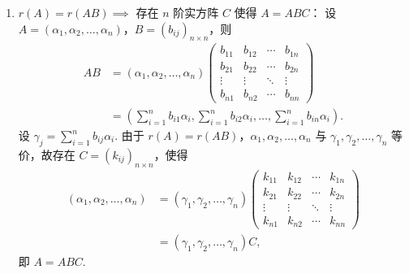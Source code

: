 \begin{exercise}
\begin{exgroup}
\begin{answer}
\begin{enumerate}
                \item $r(A) = r(AB) \implies$ 存在 $n$ 阶实方阵 $C$ 使得 $A = ABC$：
                    设 $A = (\alpha_1, \alpha_2, \ldots, \alpha_n)$，$B = (b_{ij})_{n \times n}$，则
                    \begin{align*}
                        AB &= (\alpha_1, \alpha_2, \ldots, \alpha_n) \begin{pmatrix}
                                  b_{11} & b_{12} & \cdots & b_{1n} \\
                                  b_{21} & b_{22} & \cdots & b_{2n} \\
                                  \vdots & \vdots & \ddots & \vdots \\
                                  b_{n1} & b_{n2} & \cdots & b_{nn}
                              \end{pmatrix} \\
                           &= \left( \sum\limits_{i=1}^n b_{i1} \alpha_i, \sum\limits_{i=1}^n b_{i2} \alpha_i, \ldots, \sum\limits_{i=1}^n b_{in} \alpha_i \right).
                    \end{align*}
                    设 $\gamma_j = \sum\limits_{i=1}^n b_{ij} \alpha_i$. 由于 $r(A) = r(AB)$，$\alpha_1, \alpha_2, \ldots, \alpha_n$ 与 $\gamma_1, \gamma_2, \ldots, \gamma_n$ 等价，故存在 $C = (k_{ij})_{n \times n}$，使得
                    \begin{align*}
                        (\alpha_1, \alpha_2, \ldots, \alpha_n)
                        &= (\gamma_1, \gamma_2, \ldots, \gamma_n) \begin{pmatrix}
                            k_{11} & k_{12} & \cdots & k_{1n} \\
                            k_{21} & k_{22} & \cdots & k_{2n} \\
                            \vdots & \vdots & \ddots & \vdots \\
                            k_{n1} & k_{n2} & \cdots & k_{nn}
                        \end{pmatrix} \\
                        &= (\gamma_1, \gamma_2, \ldots, \gamma_n) C,
                    \end{align*}
                    即 $A = ABC$.
            \end{enumerate}
        \end{answer}


\end{exgroup}
\end{exercise}
